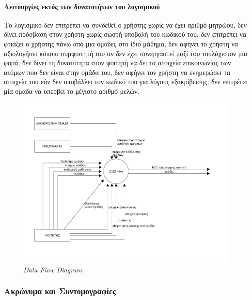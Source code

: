 \documentclass[
]{article}
\begin{document}
\hypertarget{ux3bbux3b5ux3b9ux3c4ux3bfux3c5ux3c1ux3b3ux3afux3b5ux3c2-ux3b5ux3baux3c4ux3ccux3c2-ux3c4ux3c9ux3bd-ux3b4ux3c5ux3bdux3b1ux3c4ux3bfux3c4ux3aeux3c4ux3c9ux3bd-ux3c4ux3bfux3c5-ux3bbux3bfux3b3ux3b9ux3c3ux3bcux3b9ux3baux3bfux3cd}{%
\paragraph{Λειτουργίες εκτός των δυνατοτήτων του
λογισμικού}\label{ux3bbux3b5ux3b9ux3c4ux3bfux3c5ux3c1ux3b3ux3afux3b5ux3c2-ux3b5ux3baux3c4ux3ccux3c2-ux3c4ux3c9ux3bd-ux3b4ux3c5ux3bdux3b1ux3c4ux3bfux3c4ux3aeux3c4ux3c9ux3bd-ux3c4ux3bfux3c5-ux3bbux3bfux3b3ux3b9ux3c3ux3bcux3b9ux3baux3bfux3cd}}

Το λογισμικό δεν επιτρέπει να συνδεθεί ο χρήστης χωρίς να έχει αριθμό
μητρώου, δεν δίνει πρόσβαση στον χρήστη χωρίς σωστή υποβολή του κωδικού
του, δεν επιτρέπει να φτιάξει ο χρήστης πάνω από μια ομάδες στο ίδιο
μάθημα, δεν αφήνει το χρήστη να αξιολογήσει κάποιο συμφοιτητή του αν δεν
έχει συνεργαστεί μαζί του τουλάχιστον μία φορά, δεν δίνει τη δυνατότητα
στον φοιτητή να δει τα στοιχεία επικοινωνίας των ατόμων που δεν είναι
στην ομάδα του, δεν αφήνει τον χρήστη να ενημερώσει τα στοιχεία του εάν
δεν υποβάλλει τον κωδικό του για λόγους εξακρίβωσης, δεν επιτρέπει μία
ομάδα να υπερβεί το μέγιστο αριθμό μελών.

\begin{figure}
\centering
\includegraphics{1.png}
\caption{\emph{Data Flow Diagram}}
\end{figure}

\hypertarget{ux3b1ux3baux3c1ux3ceux3bdux3c5ux3bcux3b1-ux3baux3b1ux3b9-ux3c3ux3c5ux3bdux3c4ux3bfux3bcux3bfux3b3ux3c1ux3b1ux3c6ux3afux3b5ux3c2}{%
\subsubsection{Ακρώνυμα και
Συντομογραφίες}\label{ux3b1ux3baux3c1ux3ceux3bdux3c5ux3bcux3b1-ux3baux3b1ux3b9-ux3c3ux3c5ux3bdux3c4ux3bfux3bcux3bfux3b3ux3c1ux3b1ux3c6ux3afux3b5ux3c2}}
\end{document}
